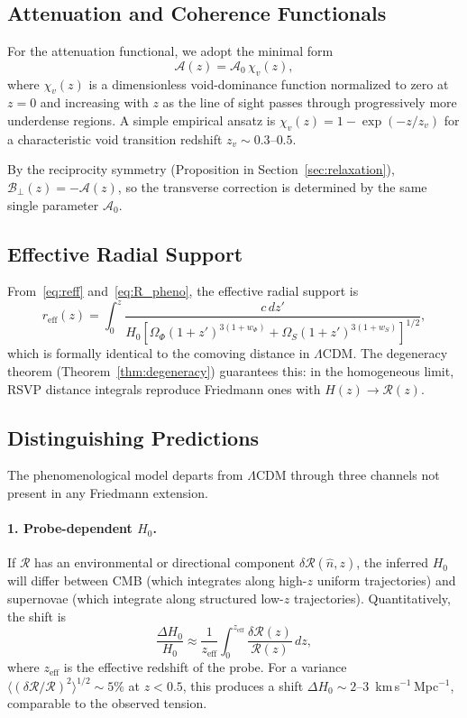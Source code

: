 \documentclass[12pt,a4paper]{article}
\theoremstyle{remark}
\newcommand{\Rcal}{\mathcal{R}}
\newcommand{\Acal}{\mathcal{A}}
\newcommand{\Bcal}{\mathcal{B}}
\newcommand{\reff}{r_{\mathrm{eff}}}
\begin{document}
\subsection{Attenuation and Coherence Functionals}

For the attenuation functional, we adopt the minimal form
\begin{equation}
\Acal(z) = \Acal_0\,\chi_v(z),
\end{equation}
where $\chi_v(z)$ is a dimensionless void-dominance function normalized to
zero at $z = 0$ and increasing with $z$ as the line of sight passes through
progressively more underdense regions. A simple empirical ansatz is
$\chi_v(z) = 1 - \exp(-z/z_v)$ for a characteristic void transition redshift
$z_v \sim 0.3$--$0.5$.

By the reciprocity symmetry (Proposition in Section~\ref{sec:relaxation}),
$\Bcal_\perp(z) = -\Acal(z)$, so the transverse correction is determined by
the same single parameter $\Acal_0$.

\subsection{Effective Radial Support}

From~\eqref{eq:reff} and~\eqref{eq:R_pheno}, the effective radial support is
\begin{equation}
\reff(z) = \int_0^z \frac{c\, dz'}{H_0\left[\Omega_\Phi(1+z')^{3(1+w_\Phi)}
+ \Omega_S(1+z')^{3(1+w_S)}\right]^{1/2}},
\end{equation}
which is formally identical to the comoving distance in $\Lambda$CDM. The
degeneracy theorem (Theorem~\ref{thm:degeneracy}) guarantees this: in the
homogeneous limit, RSVP distance integrals reproduce Friedmann ones with
$H(z) \to \Rcal(z)$.

\subsection{Distinguishing Predictions}

The phenomenological model departs from $\Lambda$CDM through three channels
not present in any Friedmann extension.

\paragraph{1. Probe-dependent $H_0$.}
If $\Rcal$ has an environmental or directional component
$\delta\Rcal(\hat{n}, z)$, the inferred $H_0$ will differ between CMB (which
integrates along high-$z$ uniform trajectories) and supernovae (which integrate
along structured low-$z$ trajectories). Quantitatively, the shift is
\begin{equation}
\frac{\Delta H_0}{H_0} \approx \frac{1}{z_{\mathrm{eff}}}
\int_0^{z_{\mathrm{eff}}} \frac{\delta\Rcal(z)}{\Rcal(z)}\, dz,
\end{equation}
where $z_{\mathrm{eff}}$ is the effective redshift of the probe. For a
variance $\langle(\delta\Rcal/\Rcal)^2\rangle^{1/2} \sim 5\%$ at $z < 0.5$,
this produces a shift $\Delta H_0 \sim 2$--$3$~km\,s$^{-1}$\,Mpc$^{-1}$,
comparable to the observed tension.
\end{document}
